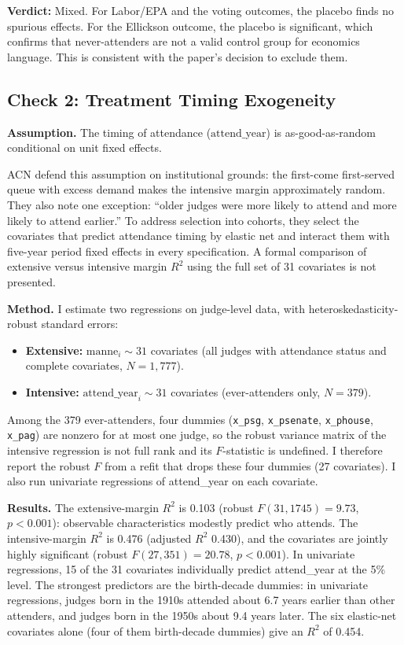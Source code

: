 \documentclass[12pt,a4paper]{article}
\begin{document}
\textbf{Verdict:} Mixed. For Labor/EPA and the voting outcomes, the placebo finds no spurious effects. For the Ellickson outcome, the placebo is significant, which confirms that never-attenders are not a valid control group for economics language. This is consistent with the paper's decision to exclude them.

\subsection{Check 2: Treatment Timing Exogeneity}
\label{sec:check2}

\textbf{Assumption.} The timing of attendance ($\text{attend\_year}$) is as-good-as-random conditional on unit fixed effects.

ACN defend this assumption on institutional grounds: the first-come first-served queue with excess demand makes the intensive margin approximately random. They also note one exception: ``older judges were more likely to attend and more likely to attend earlier.'' To address selection into cohorts, they select the covariates that predict attendance timing by elastic net and interact them with five-year period fixed effects in every specification. A formal comparison of extensive versus intensive margin $R^2$ using the full set of 31 covariates is not presented.

\textbf{Method.} I estimate two regressions on judge-level data, with heteroskedasticity-robust standard errors:
\begin{itemize}[nosep]
    \item \textbf{Extensive:} $\text{manne}_i \sim 31$ covariates (all judges with attendance status and complete covariates, $N = 1,\!777$).
    \item \textbf{Intensive:} $\text{attend\_year}_i \sim 31$ covariates (ever-attenders only, $N = 379$).
\end{itemize}
Among the 379 ever-attenders, four dummies (\texttt{x\_psg}, \texttt{x\_psenate}, \texttt{x\_phouse}, \texttt{x\_pag}) are nonzero for at most one judge, so the robust variance matrix of the intensive regression is not full rank and its $F$-statistic is undefined. I therefore report the robust $F$ from a refit that drops these four dummies (27 covariates). I also run univariate regressions of attend\_year on each covariate.

\textbf{Results.} The extensive-margin $R^2$ is 0.103 (robust $F(31, 1745) = 9.73$, $p < 0.001$): observable characteristics modestly predict who attends. The intensive-margin $R^2$ is 0.476 (adjusted $R^2$ 0.430), and the covariates are jointly highly significant (robust $F(27, 351) = 20.78$, $p < 0.001$). In univariate regressions, 15 of the 31 covariates individually predict attend\_year at the 5\% level. The strongest predictors are the birth-decade dummies: in univariate regressions, judges born in the 1910s attended about 6.7 years earlier than other attenders, and judges born in the 1950s about 9.4 years later. The six elastic-net covariates alone (four of them birth-decade dummies) give an $R^2$ of 0.454.
\end{document}
